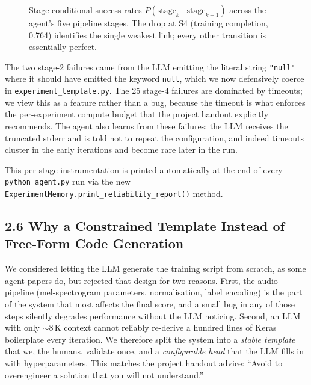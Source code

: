 \documentclass[11pt,a4paper]{article}
\begin{document}
\begin{figure}[h]
\centering
{}
\caption{Stage-conditional success rates $P(\text{stage}_k \mid \text{stage}_{k-1})$ across the agent's five pipeline stages. The drop at S4 (training completion, 0.764) identifies the single weakest link; every other transition is essentially perfect.}
\end{figure}

The two stage-2 failures came from the LLM emitting the literal string \texttt{"null"} where it should have emitted the keyword \texttt{null}, which we now defensively coerce in \texttt{experiment\_template.py}. The 25 stage-4 failures are dominated by timeouts; we view this as a feature rather than a bug, because the timeout is what enforces the per-experiment compute budget that the project handout explicitly recommends. The agent also learns from these failures: the LLM receives the truncated stderr and is told not to repeat the configuration, and indeed timeouts cluster in the early iterations and become rare later in the run.

This per-stage instrumentation is printed automatically at the end of every \texttt{python agent.py} run via the new \texttt{ExperimentMemory.print\_reliability\_report()} method.

\subsection*{2.6 Why a Constrained Template Instead of Free-Form Code Generation}

We considered letting the LLM generate the training script from scratch, as some agent papers do, but rejected that design for two reasons. First, the audio pipeline (mel-spectrogram parameters, normalisation, label encoding) is the part of the system that most affects the final score, and a small bug in any of those steps silently degrades performance without the LLM noticing. Second, an LLM with only $\sim$8\,K context cannot reliably re-derive a hundred lines of Keras boilerplate every iteration. We therefore split the system into a \emph{stable template} that we, the humans, validate once, and a \emph{configurable head} that the LLM fills in with hyperparameters. This matches the project handout advice: ``Avoid to overengineer a solution that you will not understand.''
\end{document}
